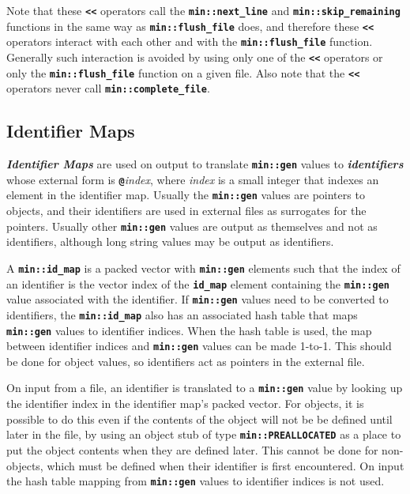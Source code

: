 \documentclass[12pt]{article}
\newcommand{\TT}[1]{{\tt \bfseries #1}}
\newcommand{\smkey}[3]{{\bf \em #1#2}\index{#1!#3}}
\newcommand{\ikey}[2]{{\bf \em #1}\index{#2}}
\newcommand{\EOL}{\penalty \exhyphenpenalty}
\begin{document}
Note that these \TT{<{}<} operators call the \TT{min::\EOL next\_\EOL line}
and \TT{min::\EOL skip\_\EOL remaining} functions in the same way as
\TT{min::\EOL flush\_\EOL file} does, and therefore
these \TT{<{}<} operators interact with each other and with the
\TT{min::\EOL flush\_\EOL file} function.  Generally such interaction
is avoided by using only one of the \TT{<{}<} operators or only
the \TT{min::\EOL flush\_\EOL file} function on a given file.
Also note that the \TT{<{}<} operators never
call \TT{min::\EOL complete\_\EOL file}.

\subsection{Identifier Maps}
\label{IDENTIFIER-MAPS}

\ikey{Identifier Maps}{identifier map} are used on output
to translate \TT{min::gen} values to
\smkey{identifier}s{in identifier map} whose external form is
\TT{@}{\em index}, where {\em index} is a small integer
that indexes an element in the identifier map.
Usually the \TT{min::gen} values are pointers to objects,
and their identifiers are used in external files as surrogates
for the pointers.  Usually other \TT{min::gen} values are
output as themselves and not as identifiers, although long
string values may be output as identifiers.

A \TT{min::\EOL id\_\EOL map} is a packed vector with
\TT{min::gen} elements such that the index of an identifier
is the vector index of the \TT{id\_map} element containing the
\TT{min::gen} value associated with the identifier.
If \TT{min::gen} values need to be converted to identifiers, the
\TT{min::\EOL id\_\EOL map} also has an associated hash table
that maps \TT{min::gen} values to identifier indices.
When the hash table is used, the map between identifier indices
and \TT{min::gen} values can be made 1-to-1.  This should be done for
object values, so identifiers act as pointers in the external file.

On input from a file, an identifier is translated
to a \TT{min::gen} value by looking up the identifier index
in the identifier map's packed vector.  For objects, it is possible to do
this even if the contents of the object will not be be defined
until later in the file, by using an object stub of type
\TT{min::PREALLOCATED} as a place to put the object contents when
they are defined later.  This cannot be done for non-objects, which
must be defined when their identifier is first encountered.
On input the hash table mapping from
\TT{min::gen} values to identifier indices is not used.
\end{document}
